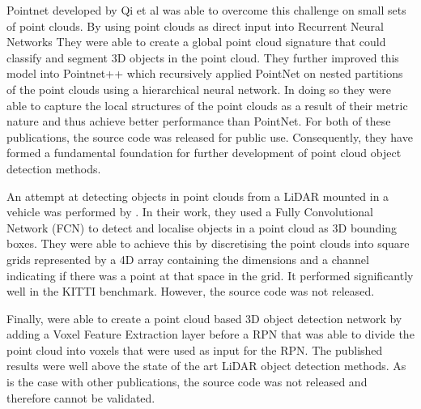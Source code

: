 Pointnet\cite{qi2017pointnet} developed by Qi et al was able to overcome this challenge on small sets of point clouds. By using point clouds as direct input into Recurrent Neural Networks\cite{medsker2001recurrent} They were able to create a global point cloud signature that could classify and segment 3D objects in the point cloud. They further improved this model into Pointnet++\cite{qi2017pointnet++} which recursively applied PointNet on nested partitions of the point clouds using a hierarchical neural network. In doing so they were able to capture the local structures of the point clouds as a result of their metric nature and thus achieve better performance than PointNet. For both of these publications, the source code was released for public use. Consequently, they have formed a fundamental foundation for further development of point cloud object detection methods.

An attempt at detecting objects in point clouds from a  LiDAR mounted in a vehicle was performed by \cite{li20163d}. In their work, they used a Fully Convolutional Network (FCN) to detect and localise objects in a point cloud as 3D bounding boxes. They were able to achieve this by discretising the point clouds into square grids represented by a 4D array containing the dimensions and a channel indicating if there was a point at that space in the grid. It performed significantly well in the KITTI benchmark. However, the source code was not released. 

Finally, \cite{zhou2017voxelnet}  were able to create a point cloud based 3D object detection network by adding a Voxel Feature Extraction layer before a RPN that was able to divide the point cloud into voxels that were used as input for the RPN. The published results were well above the state of the art LiDAR object detection methods. As is the case with other publications, the source code was not released and therefore cannot be validated.  

